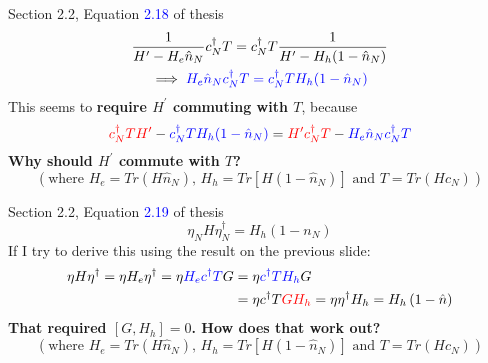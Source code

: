 \documentclass[12pt,aspectratio=169]{beamer}
\newcommand{\qs}[1]{\textbf{\textcolor{bottlegreen}{#1}}}
\begin{document}
\begin{frame}
	Section 2.2, Equation \textcolor{blue}{2.18} of thesis
\begin{equation*}
\begin{gathered}
	\frac{1}{H^\prime - H_e\hat n_N}c^\dagger_N T	= c^\dagger_N T\frac{1}{H^\prime - H_h(1-\hat n_N)}\\
	\implies \textcolor{blue}{H_e\hat n_Nc^\dagger_N T = c^\dagger_N TH_h(1-\hat n_N)}
\end{gathered}
\end{equation*}
This seems to \textbf{require \(H^\prime\) commuting with \(T\)}, because
\begin{equation*}
	\textcolor{red}{c^\dagger_N TH^\prime} - \textcolor{blue}{c^\dagger_N TH_h(1-\hat n_N)}= \textcolor{red}{H^\prime c^\dagger_N T} - \textcolor{blue}{H_e\hat n_Nc^\dagger_N T}
\end{equation*}
\qs{Why should $H^\prime$ commute with $T$?}
\begin{equation*}
	(\text{where } H_e = Tr\left(H\hat n_N\right) \text{, } H_h = Tr\left[H\left(1-\hat n_N\right)\right] \text{ and }T = Tr\left(Hc_N\right))
\end{equation*}
\end{frame}

\begin{frame}
	Section 2.2, Equation \textcolor{blue}{2.19} of thesis
\begin{equation*}
	\eta_N H \eta_N^\dagger = H_h \left(1 - n_N\right)
\end{equation*}
If I try to derive this using the result on the previous slide:
\begin{equation*}
\begin{aligned}
	\eta H \eta^\dagger = \eta H_e \eta^\dagger = \eta \textcolor{blue}{H_e c^\dagger T} G &= \eta \textcolor{blue}{c^\dagger T H_h} G \\
											       &= \eta c^\dagger T \textcolor{red}{G H_h} = \eta \eta^\dagger H_h = H_h \left(1 - \hat n\right)
\end{aligned}
\end{equation*}
\qs{That required $\left[G,H_h\right]=0$. How does that work out?}
\begin{equation*}
	(\text{where } H_e = Tr\left(H\hat n_N\right) \text{, } H_h = Tr\left[H\left(1-\hat n_N\right)\right] \text{ and }T = Tr\left(Hc_N\right))
\end{equation*}
\end{frame}
\end{document}
